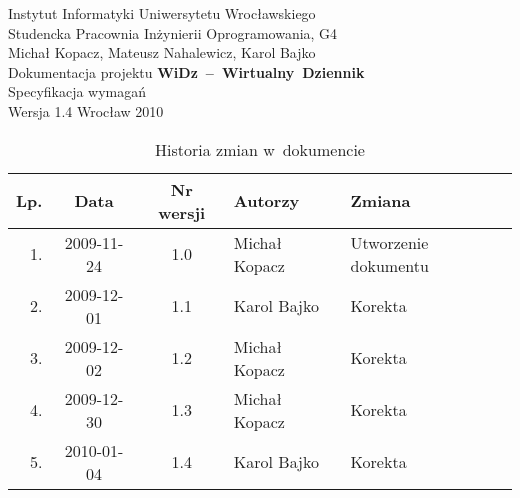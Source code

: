 \documentclass[12pt,leqno,twoside]{mwart}
\begin{document}
\begin{titlepage}
\begin{center}
Instytut Informatyki Uniwersytetu Wrocławskiego \\
Studencka Pracownia Inżynierii Oprogramowania, G4 \\
\vspace{4cm}
\Large Michał Kopacz, Mateusz Nahalewicz, Karol Bajko \\
\vspace{0.5cm}
\huge Dokumentacja projektu \mbox{\textbf{WiDz -- Wirtualny Dziennik}} \\ \Large Specyfikacja wymagań\\
\vspace{1cm}
\normalsize Wersja 1.4
\vfill
\normalsize Wrocław 2010
\end{center}
\end{titlepage}

\newpage

\begin{table}
	\centering
	\caption{Historia zmian w~dokumencie}
		\begin{tabular}{|r|c|c|l|l|}
		\hline
		Lp. 	& Data       & Nr wersji 	& Autorzy           		& Zmiana \\ \hline
		1.   	& 2009-11-24 & 1.0       	& Michał Kopacz & Utworzenie dokumentu \\ \hline
		2.	& 2009-12-01 & 1.1			& Karol Bajko & Korekta	\\ \hline
		3.	& 2009-12-02 & 1.2			& Michał Kopacz & Korekta	\\ \hline
		4.	& 2009-12-30 & 1.3			& Michał Kopacz & Korekta	\\ \hline
		5.	& 2010-01-04 & 1.4			& Karol Bajko	& Korekta	\\ \hline
		\end{tabular}
\end{table}

\newpage

\tableofcontents

\newpage
\end{document}
